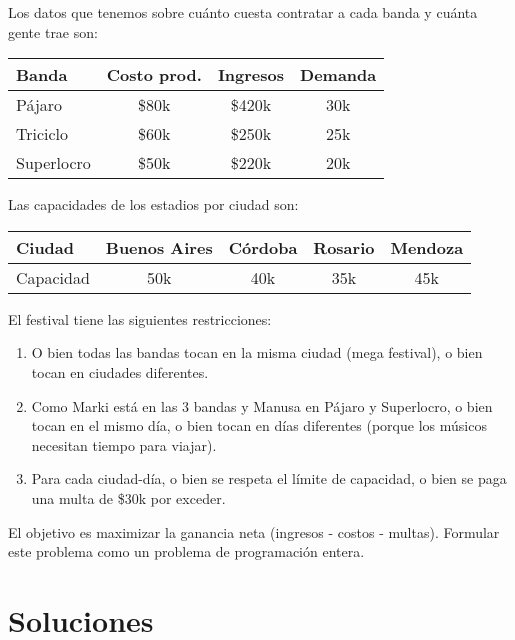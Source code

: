 \documentclass[12pt]{article}
\begin{document}
\vspace{0.5em}

Los datos que tenemos sobre cuánto cuesta contratar a cada banda y cuánta gente trae son:
\begin{table}[H]
\centering
\begin{tabular}{lccc}
\toprule
\textbf{Banda} & \textbf{Costo prod.} & \textbf{Ingresos} & \textbf{Demanda} \\
\midrule
Pájaro & \$80k & \$420k & 30k \\
Triciclo & \$60k & \$250k & 25k \\
Superlocro & \$50k & \$220k & 20k \\
\bottomrule
\end{tabular}
\end{table}

Las capacidades de los estadios por ciudad son:
\begin{table}[H]
\centering
\begin{tabular}{lcccc}
\toprule
\textbf{Ciudad} & \textbf{Buenos Aires} & \textbf{Córdoba} & \textbf{Rosario} & \textbf{Mendoza} \\
\midrule
Capacidad & 50k & 40k & 35k & 45k \\
\bottomrule
\end{tabular}
\end{table}

El festival tiene las siguientes restricciones:
\begin{enumerate}[label=\arabic*.]
    \item O bien todas las bandas tocan en la misma ciudad (mega festival), o bien tocan en ciudades diferentes.
    \item Como Marki está en las 3 bandas y Manusa en Pájaro y Superlocro, o bien tocan en el mismo día, o bien tocan en días diferentes (porque los músicos necesitan tiempo para viajar).
    \item Para cada ciudad-día, o bien se respeta el límite de capacidad, o bien se paga una multa de \$30k por exceder.
\end{enumerate}

El objetivo es maximizar la ganancia neta (ingresos - costos - multas). Formular este problema como un problema de programación entera.

\newpage

\section{Soluciones}
\end{document}
